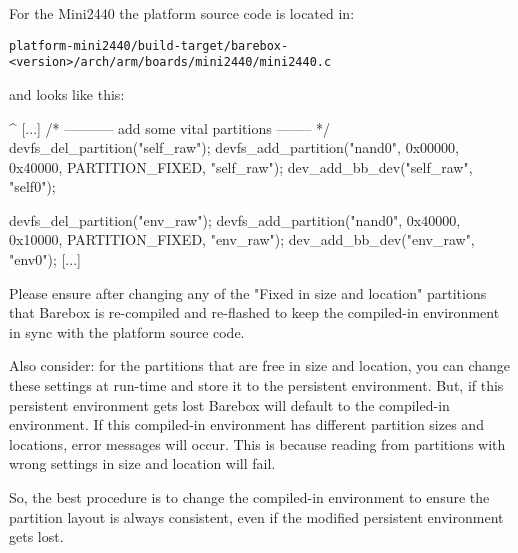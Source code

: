 For the Mini2440 the platform source code is located in:

\texttt{platform-mini2440/build-target/barebox-<version>/arch/arm/boards/mini2440/mini2440.c}

and looks like this:

\begin{ptxshell}[escapechar=|]{^}
[...]
      /* ----------- add some vital partitions -------- */
   devfs_del_partition("self_raw");
   devfs_add_partition("nand0", 0x00000, 0x40000, PARTITION_FIXED, "self_raw");
   dev_add_bb_dev("self_raw", "self0");

   devfs_del_partition("env_raw");
   devfs_add_partition("nand0", 0x40000, 0x10000, PARTITION_FIXED, "env_raw");
   dev_add_bb_dev("env_raw", "env0");
[...]
\end{ptxshell}

Please ensure after changing any of the "Fixed in size and location" partitions
that Barebox is re-compiled and re-flashed to keep the compiled-in environment
in sync with the platform source code.

Also consider: for the partitions that are free in size and location, you can
change these settings at run-time and store it to the persistent environment.
But, if this persistent environment gets lost Barebox will default to the
compiled-in environment. If this compiled-in environment has different
partition sizes and locations, error messages will occur. This is because
reading from partitions with wrong settings in size and location will fail.

So, the best procedure is to change the compiled-in environment to ensure the
partition layout is always consistent, even if the modified persistent
environment gets lost.
